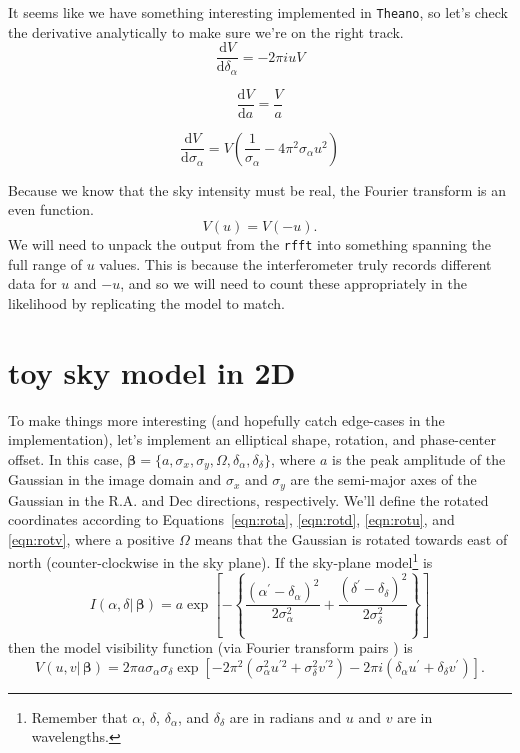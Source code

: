 \documentclass[modern]{aastex62}
\newcommand{\theano}{\texttt{Theano}}
\newcommand{\bbeta}{\boldsymbol{\beta}} %
\begin{document}
It seems like we have something interesting implemented in \theano, so let's check the derivative analytically to make sure we're on the right track. 
\begin{equation}
    \frac{\mathrm{d}V}{\mathrm{d}\delta_\alpha} = -2 \pi i u V
\end{equation}

\begin{equation}
    \frac{\mathrm{d}V}{\mathrm{d}a} = \frac{V}{a}
\end{equation}

\begin{equation}
    \frac{\mathrm{d}V}{\mathrm{d}\sigma_\alpha} = V \left ( \frac{1}{\sigma_\alpha} - 4 \pi^2 \sigma_\alpha u^2 \right)
\end{equation}

Because we know that the sky intensity must be real, the Fourier transform is an even function.
\begin{equation}
    V(u) = V(-u).
\end{equation}
We will need to unpack the output from the \texttt{rfft} into something spanning the full range of $u$ values. This is because the interferometer truly records different data for $u$ and $-u$, and so we will need to count these appropriately in the likelihood by replicating the model to match.

\section{toy sky model in 2D}
To make things more interesting (and hopefully catch edge-cases in the implementation), let's implement an elliptical shape, rotation, and phase-center offset. In this case, $\bbeta = \{a, \sigma_x, \sigma_y, \Omega, \delta_\alpha, \delta_\delta \}$, where $a$ is the peak amplitude of the Gaussian in the image domain and $\sigma_x$ and $\sigma_y$ are the semi-major axes of the Gaussian in the R.A. and Dec directions, respectively. We'll define the rotated coordinates according to Equations~\ref{eqn:rota}, \ref{eqn:rotd}, \ref{eqn:rotu}, and \ref{eqn:rotv}, where a positive $\Omega$ means that the Gaussian is rotated towards east of north (counter-clockwise in the sky plane). If the sky-plane model\footnote{Remember that $\alpha$, $\delta$, $\delta_\alpha$, and $\delta_\delta$ are in radians and $u$ and $v$ are in wavelengths.} is
\begin{equation}
    I(\alpha, \delta |\, \bbeta) = a \exp \left [ - \left \{  \frac{(\alpha^\prime - \delta_\alpha)^2}{2 \sigma_\alpha^2} + \frac{(\delta^\prime - \delta_\delta)^2}{2 \sigma_\delta^2} \right \} \right ]
\end{equation}
then the model visibility function (via Fourier transform pairs \citep[e.g., ch. 16,][]{bracewell00}) is
\begin{equation}
    V(u, v |\, \bbeta) = 2 \pi a \sigma_\alpha \sigma_\delta \exp \left [ -2 \pi^2 (\sigma_\alpha^2 u^{\prime 2} + \sigma_\delta^2 v^{\prime 2}) - 2 \pi i (\delta_\alpha u^\prime + \delta_\delta v^\prime)\right ].
\end{equation}
\end{document}
